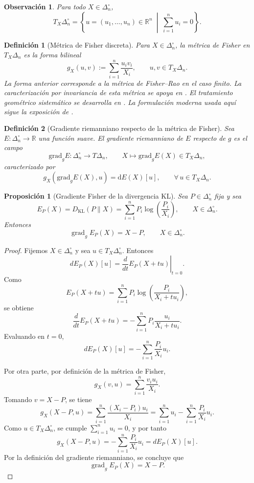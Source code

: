 \documentclass[12pt]{article}
\newtheorem{definicion}{Definición}[section]
\newtheorem{proposicion}{Proposición}[section]
\newtheorem{observacion}{Observación}[section]
\begin{document}
\begin{observacion}
Para todo $X\in\Delta_n^\circ$,
\[
T_X\Delta_n^\circ
=
\left\{
u=(u_1,\dots,u_n)\in\mathbb R^n
\;\middle|\;
\sum_{i=1}^n u_i=0
\right\}.
\]
\end{observacion}

\begin{definicion}[Métrica de Fisher discreta]\label{def:Fisher}
Para $X\in\Delta_n^\circ$, la \emph{métrica de Fisher} en $T_X\Delta_n$ es la forma bilineal
\[
g_X(u,v)
:=
\sum_{i=1}^n \frac{u_i v_i}{X_i},
\qquad
u,v\in T_X\Delta_n.
\]
La forma anterior corresponde a la métrica de Fisher--Rao en el caso finito. La caracterización por invariancia de esta métrica se apoya en \citep{Chentsov1982}. El tratamiento geométrico sistemático se desarrolla en \citep{AmariNagaoka2000}. La formulación moderna usada aquí sigue la exposición de \citep{Amari2016}.
\end{definicion}

\begin{definicion}[Gradiente riemanniano respecto de la métrica de Fisher]\label{def:gradienteFisher}
Sea $E:\Delta_n^\circ\to\mathbb R$ una función suave. El \emph{gradiente riemanniano} de $E$ respecto de $g$ es el campo
\[
\mathrm{grad}_gE:\Delta_n^\circ\to T\Delta_n,
\qquad
X\mapsto \mathrm{grad}_gE(X)\in T_X\Delta_n,
\]
caracterizado por
\[
g_X(\mathrm{grad}_gE(X),u)=\mathrm dE(X)[u],
\qquad
\forall\,u\in T_X\Delta_n.
\]
\end{definicion}
\begin{proposicion}[Gradiente Fisher de la divergencia KL]\label{prop:gradKL}
Sea $P\in\Delta_n^\circ$ fija y sea
\[
E_P(X)=D_{\mathrm{KL}}(P\|X)=\sum_{i=1}^n P_i \log\!\left(\frac{P_i}{X_i}\right),
\qquad X\in\Delta_n^\circ.
\]
Entonces
\[
\operatorname{grad}_g E_P(X)=X-P,
\qquad X\in\Delta_n^\circ.
\]
\end{proposicion}

\begin{proof}
Fijemos $X\in\Delta_n^\circ$ y sea $u\in T_X\Delta_n^\circ$. Entonces
\[
dE_P(X)[u]
=
\left.\frac{d}{dt}E_P(X+tu)\right|_{t=0}.
\]
Como
\[
E_P(X+tu)
=
\sum_{i=1}^n P_i \log\!\left(\frac{P_i}{X_i+tu_i}\right),
\]
se obtiene
\[
\frac{d}{dt}E_P(X+tu)
=
-\sum_{i=1}^n P_i \frac{u_i}{X_i+tu_i}.
\]
Evaluando en $t=0$,
\[
dE_P(X)[u]
=
-\sum_{i=1}^n \frac{P_i}{X_i}u_i.
\]

Por otra parte, por definición de la métrica de Fisher,
\[
g_X(v,u)=\sum_{i=1}^n \frac{v_i u_i}{X_i}.
\]
Tomando $v=X-P$, se tiene
\[
g_X(X-P,u)
=
\sum_{i=1}^n \frac{(X_i-P_i)u_i}{X_i}
=
\sum_{i=1}^n u_i - \sum_{i=1}^n \frac{P_i}{X_i}u_i.
\]
Como $u\in T_X\Delta_n^\circ$, se cumple $\sum_{i=1}^n u_i=0$, y por tanto
\[
g_X(X-P,u)
=
-\sum_{i=1}^n \frac{P_i}{X_i}u_i
=
dE_P(X)[u].
\]
Por la definición del gradiente riemanniano, se concluye que
\[
\operatorname{grad}_g E_P(X)=X-P.
\]
\end{proof}
\end{document}
